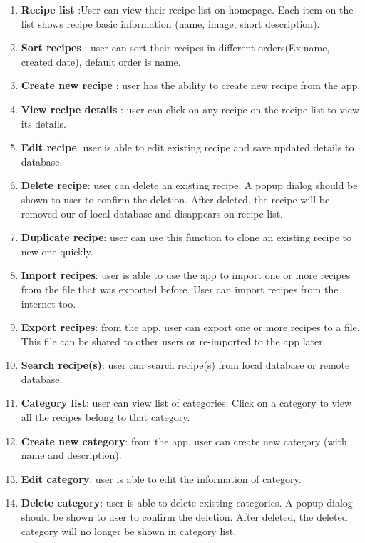 \documentclass{article}
\begin{document}
    \begin{enumerate}
        \item \textbf{Recipe list }:User can view their recipe list on homepage. Each item on the list shows recipe basic information (name, image, short description).
        \item \textbf{Sort recipes }: user can sort their recipes in different orders(Ex:name, created date), default order is name. 
        \item \textbf{Create new recipe} : user has the ability to create new recipe from the app.
        \item \textbf{View recipe details} : user can click on any recipe on the recipe list to view its details.
        \item \textbf{Edit recipe}: user is able to edit existing recipe and save updated details to database.
        \item \textbf{Delete recipe}: user can delete an existing recipe. A popup dialog should be shown to user to confirm the deletion. After deleted, the recipe will be removed our of local database and disappears on recipe list.
        \item \textbf{Duplicate recipe}: user can use this function to clone an existing recipe to new one quickly.
        \item \textbf{Import recipes}: user is able to use the app to import one or more recipes from the file that was exported before. User can import recipes from the internet too.
        \item \textbf{Export recipes}: from the app, user can export one or more recipes to a file. This file can be shared to other users or re-imported to the app later.
        \item \textbf{Search recipe(s)}: user can search recipe(s) from local database or remote database.
        \item \textbf{Category list}: user can view list of categories. Click on a category to view all the recipes belong to that category.
        \item \textbf{Create new category}: from the app, user can create new category (with name and description).
        \item \textbf{Edit category}: user is able to edit the information of category.
        \item \textbf{Delete category}: user is able to delete existing categories. A popup dialog should be shown to user to confirm the deletion. After deleted, the deleted category will no longer be shown in category list.

\end{enumerate}
\end{document}
